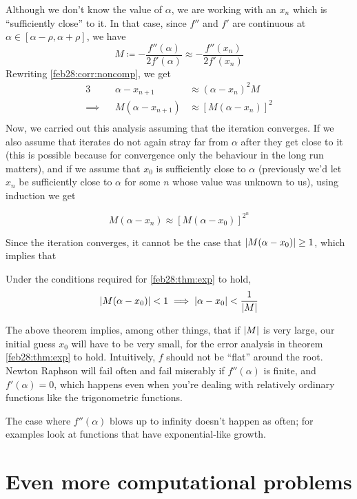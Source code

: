 Although we don't know the value of $\alpha$, we are working with an $x_n$ which is ``sufficiently close'' to it. In that case, since $f''$ and $f'$ are continuous at $\alpha \in [\alpha - \rho, \alpha + \rho]$, we have
\[
  M \coloneqq -\frac{f''(\alpha)}{2f'(\alpha)} \approx -\frac{f''(x_n)}{2f'(x_n)}
\]
Rewriting \ref{feb28:corr:noncomp}, we get
\begin{alignat*}{3}
  &&\alpha - x_{n+1}
  &\approx
  (\alpha - x_n)^2M \\
  \implies&& M\left(\alpha - x_{n+1}\right)
  &\approx
  \left[M\left(\alpha - x_{n}\right)\right]^2 \\
\end{alignat*}
Now, we carried out this analysis assuming that the iteration converges. If we also assume that iterates do not again stray far from $\alpha$ after they get close to it (this is possible because for convergence only the behaviour in the long run matters), and if we assume that $x_0$ is sufficiently close to $\alpha$ (previously we'd let $x_n$ be sufficiently close to $\alpha$ for some $n$ whose value was unknown to us), using induction we get
\begin{thm}
  \label{feb28:thm:exp}
  \[
    M\left(\alpha - x_{n}\right)
    \approx
    \left[M\left(\alpha - x_{0}\right)\right]^{2^n}
  \]
\end{thm}
Since the iteration converges, it cannot be the case that $\abs{M(\alpha - x_0)} \geq 1$, which implies that
\begin{thm}
  Under the conditions required for \ref{feb28:thm:exp} to hold,
  \[
    \abs{M(\alpha - x_0)} < 1 \implies \abs{\alpha - x_0} < \frac{1}{\abs{M}}
  \]
\end{thm}
The above theorem implies, among other things, that if $\abs{M}$ is very large, our initial guess $x_0$ will have to be very small, for the error analysis in theorem \ref{feb28:thm:exp} to hold. Intuitively, $f$ should not be ``flat'' around the root. Newton Raphson will fail often and fail miserably if $f''(\alpha)$ is finite, and $f'(\alpha) = 0$, which happens even when you're dealing with relatively ordinary functions like the trigonometric functions.

The case where $f''(\alpha)$ blows up to infinity doesn't happen as often; for examples look at functions that have exponential-like growth.

\section{Even more computational problems}

